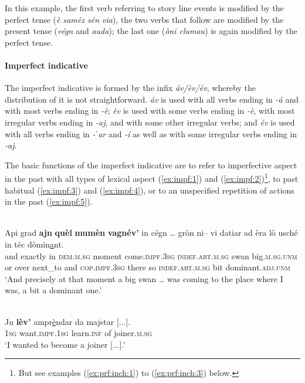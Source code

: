 In this example, the first verb referring to story line events is modified by the perfect tense (\textit{è saméz sén via}), the two verbs that follow are modified by the present tense (\textit{végn} and \textit{auda}); the last one (\textit{òni clumau}) is again modified by the perfect tense.

\paragraph{Imperfect indicative}
The imperfect indicative is formed by the infix \textit{áv/èv/év}, whereby the distribution of it is not straightforward. \textit{áv} is used with all verbs ending in \textit{-á} and with most verbs ending in \textit{-è}; \textit{èv} is used with some verbs ending in \textit{-è}, with most irregular verbs ending in \textit{-aj}, and with some other irregular verbs; and \textit{év} is used with all verbs ending in \textit{-ˈar} and \textit{-í} as well as with some irregular verbs ending in \textit{-aj}.

The basic functions of the imperfect indicative are to refer to imperfective aspect in the past with all types of lexical aspect (\ref{ex:impf:1}) and (\ref{ex:impf:2})\footnote{But see examples (\ref{ex:prf:inch:1}) to (\ref{ex:prf:inch:3}) below.}, to past habitual (\ref{ex:impf:3}) and (\ref{ex:impf:4}), or to an unspecified repetition of actions in the past (\ref{ex:impf:5}).
	
\ea\label{ex:impf:1}
\\
\gll Api grad \textbf{ajn} \textbf{quèl} \textbf{mumèn} \textbf{vagnév’} in cégn … gròn ni– vi datiar ad èra lò usché in téc dòmin\underline{a}nt.\\
and exactly in \textsc{dem.m.sg} moment come.\textsc{impf.3sg} \textsc{indef.art.m.sg} swan {} big.\textsc{m.sg.unm} or over next\_to and \textsc{cop.impf.3sg} there so \textsc{indef.art.m.sg} bit dominant.\textsc{adj.unm}\\
\glt `And precisely at that moment a big swan … was coming to the place where I was, a bit a dominant one.'
\z

\ea\label{ex:impf:2}
\\
\gll    Ju \textbf{lèv’} ampr\underline{è}ndar da majstar [...].\\
\textsc{1sg} want.\textsc{impf.1sg} learn.\textsc{inf} of joiner.\textsc{m.sg}\\
\glt `I wanted to become a joiner [...].'
\z

